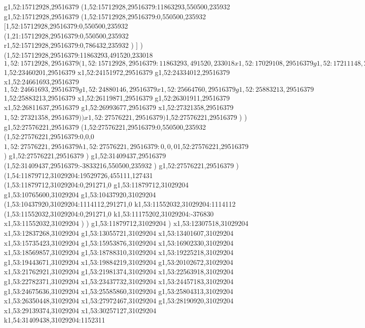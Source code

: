 {g1,52:15712928,29516379
(1,52:15712928,29516379:11863293,550500,235932
g1,52:15712928,29516379
(1,52:15712928,29516379:0,550500,235932
[1,52:15712928,29516379:0,550500,235932
(1,21:15712928,29516379:0,550500,235932
r1,52:15712928,29516379:0,786432,235932
)
]
)
(1,52:15712928,29516379:11863293,491520,233018
$1,52:15712928,29516379
(1,52:15712928,29516379:11863293,491520,233018
x1,52:17029108,29516379
g1,52:17211148,29516379
x1,52:17902919,29516379
g1,52:18084959,29516379
x1,52:18654755,29516379
(1,52:18654755,29634709:964310,344064,114688
x1,52:19586297,29634709
)
g1,52:20274426,29516379
x1,52:20765947,29516379
g1,52:20947987,29516379
x1,52:21457713,29516379
g1,52:21639753,29516379
x1,52:21967434,29516379
(1,52:21967434,29516379:5353924,455111,25623
(1,52:21967434,29516379:5353924,455111,25623
g1,52:22185887,29516379
x1,52:23241748,29516379
g1,52:23460201,29516379
$1,52:23460201,29516379
x1,52:24151972,29516379
g1,52:24334012,29516379
x1,52:24661693,29516379
$1,52:24661693,29516379
g1,52:24880146,29516379
x1,52:25664760,29516379
g1,52:25883213,29516379
$1,52:25883213,29516379
x1,52:26119871,29516379
g1,52:26301911,29516379
x1,52:26811637,29516379
g1,52:26993677,29516379
x1,52:27321358,29516379
$1,52:27321358,29516379
)
)
x1,52:27576221,29516379
)
$1,52:27576221,29516379
)
)
g1,52:27576221,29516379
(1,52:27576221,29516379:0,550500,235932
(1,52:27576221,29516379:0,0,0
$1,52:27576221,29516379
h1,52:27576221,29516379:0,0,0
$1,52:27576221,29516379
)
g1,52:27576221,29516379
)
g1,52:31409437,29516379
(1,52:31409437,29516379:-3833216,550500,235932
)
g1,52:27576221,29516379
)
(1,54:11879712,31029204:19529726,455111,127431
(1,53:11879712,31029204:0,291271,0
g1,53:11879712,31029204
g1,53:10765600,31029204
g1,53:10437920,31029204
(1,53:10437920,31029204:1114112,291271,0
k1,53:11552032,31029204:1114112
(1,53:11552032,31029204:0,291271,0
k1,53:11175202,31029204:-376830
x1,53:11552032,31029204
)
)
g1,53:11879712,31029204
)
x1,53:12307518,31029204
x1,53:12837268,31029204
g1,53:13055721,31029204
x1,53:13401607,31029204
x1,53:15735423,31029204
g1,53:15953876,31029204
x1,53:16902330,31029204
x1,53:18569857,31029204
g1,53:18788310,31029204
x1,53:19225218,31029204
g1,53:19443671,31029204
x1,53:19884219,31029204
g1,53:20102672,31029204
x1,53:21762921,31029204
g1,53:21981374,31029204
x1,53:22563918,31029204
g1,53:22782371,31029204
x1,53:23437732,31029204
x1,53:24457183,31029204
g1,53:24675636,31029204
x1,53:25585860,31029204
g1,53:25804313,31029204
x1,53:26350448,31029204
x1,53:27972467,31029204
g1,53:28190920,31029204
x1,53:29139374,31029204
x1,53:30257127,31029204
k1,54:31409438,31029204:1152311
}
